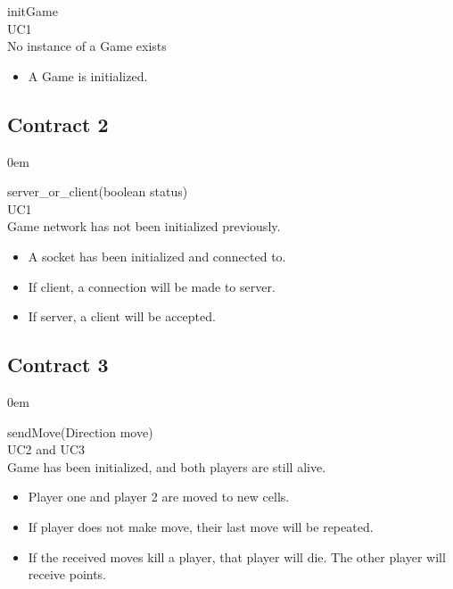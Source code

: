 \documentclass[titlepage]{article}
\begin{document}
	\textbf{} initGame\\
	\textbf{} UC1\\
	\textbf{} No instance of a Game exists\\
		\textbf{} 
				\begin{itemize} 
				\item A Game is initialized.
				\end{itemize}
		
	\subsection{Contract 2}
	\itemsep0em 
	
	\textbf{} server\_or\_client(boolean status)\\
	\textbf{} UC1\\
	\textbf{} Game network has not been initialized previously.\\
	\textbf{}
		\begin{itemize} 
			\item A socket has been initialized and connected to.
			\item If client, a connection will be made to server.
			\item If server, a client will be accepted.
		\end{itemize}
	
	\subsection{Contract 3}
	\itemsep0em 
	
	\textbf{} sendMove(Direction move)\\
	\textbf{} UC2 and UC3\\
	\textbf{} Game has been initialized, and both players are still alive.\\
	\textbf{ }
	\begin{itemize} 
		\item Player one and player 2 are moved to new cells.
		\item If player does not make move, their last move will be repeated.
		\item If the received moves kill a player, that player will die. The other player will receive points.
	\end{itemize}
	
\end{document}
